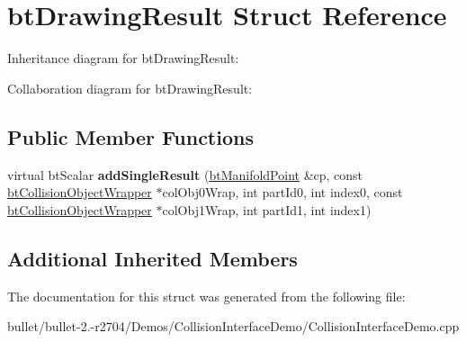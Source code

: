 \hypertarget{structbt_drawing_result}{\section{bt\+Drawing\+Result Struct Reference}
\label{structbt_drawing_result}
}


Inheritance diagram for bt\+Drawing\+Result\+:


Collaboration diagram for bt\+Drawing\+Result\+:
\subsection*{Public Member Functions}
\begin{DoxyCompactItemize}
\item 
\hypertarget{structbt_drawing_result_ac22934780bfd94dd8a377c3442cd3016}{virtual bt\+Scalar {\bfseries add\+Single\+Result} (\hyperlink{classbt_manifold_point}{bt\+Manifold\+Point} \&cp, const \hyperlink{structbt_collision_object_wrapper}{bt\+Collision\+Object\+Wrapper} $\ast$col\+Obj0\+Wrap, int part\+Id0, int index0, const \hyperlink{structbt_collision_object_wrapper}{bt\+Collision\+Object\+Wrapper} $\ast$col\+Obj1\+Wrap, int part\+Id1, int index1)}\label{structbt_drawing_result_ac22934780bfd94dd8a377c3442cd3016}

\end{DoxyCompactItemize}
\subsection*{Additional Inherited Members}


The documentation for this struct was generated from the following file\+:\begin{DoxyCompactItemize}
\item 
bullet/bullet-\/2.-\/r2704/\+Demos/\+Collision\+Interface\+Demo/Collision\+Interface\+Demo.\+cpp\end{DoxyCompactItemize}
